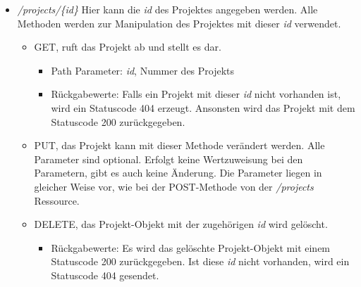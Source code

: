 \documentclass[12pt]{scrartcl}
\begin{document}
\begin{itemize}
\begin{itemize}
			\end{itemize}
			\item \emph{/projects/\{id\}} Hier kann die \emph{id} des Projektes angegeben werden. Alle Methoden werden zur Manipulation des Projektes mit dieser \emph{id} verwendet.
			\begin{itemize}
				\item GET, ruft das Projekt ab und stellt es dar. 
				\begin{itemize}
					\item Path Parameter: \emph{id}, Nummer des Projekts
					\item Rückgabewerte: Falls ein Projekt mit dieser \emph{id} nicht vorhanden ist, wird ein Statuscode 404 erzeugt. Ansonsten wird das Projekt mit dem Statuscode 200 zurückgegeben.
				\end{itemize}
				\item PUT, das Projekt kann mit dieser Methode verändert werden. Alle Parameter sind optional. Erfolgt keine Wertzuweisung bei den Parametern, gibt es auch keine Änderung. Die Parameter liegen in gleicher Weise vor, wie bei der POST-Methode von der \emph{/projects} Ressource.
				\item DELETE, das Projekt-Objekt mit der zugehörigen \emph{id} wird gelöscht.
				\begin{itemize}
					\item Rückgabewerte: Es wird das gelöschte Projekt-Objekt mit einem Statuscode 200 zurückgegeben. Ist diese \emph{id} nicht vorhanden, wird ein Statuscode 404 gesendet.
				\end{itemize}	
			\end{itemize}
	\end{itemize}
\end{document}

